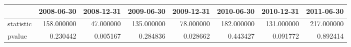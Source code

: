 \begin{tabular}{lrrrrrrr}
\toprule
{} &  2008-06-30 &  2008-12-31 &  2009-06-30 &  2009-12-31 &  2010-06-30 &  2010-12-31 &  2011-06-30 \\
\midrule
statistic &  158.000000 &   47.000000 &  135.000000 &   78.000000 &  182.000000 &  131.000000 &  217.000000 \\
pvalue    &    0.230442 &    0.005167 &    0.284836 &    0.028662 &    0.443427 &    0.091772 &    0.892414 \\
\bottomrule
\end{tabular}
